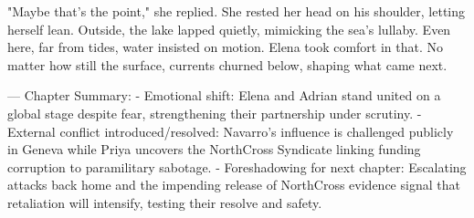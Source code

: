 "Maybe that's the point," she replied. She rested her head on his shoulder, letting herself lean. Outside, the lake lapped quietly, mimicking the sea's lullaby. Even here, far from tides, water insisted on motion. Elena took comfort in that. No matter how still the surface, currents churned below, shaping what came next.

\bigskip

---
Chapter Summary:
- Emotional shift: Elena and Adrian stand united on a global stage despite fear, strengthening their partnership under scrutiny.
- External conflict introduced/resolved: Navarro's influence is challenged publicly in Geneva while Priya uncovers the NorthCross Syndicate linking funding corruption to paramilitary sabotage.
- Foreshadowing for next chapter: Escalating attacks back home and the impending release of NorthCross evidence signal that retaliation will intensify, testing their resolve and safety.
